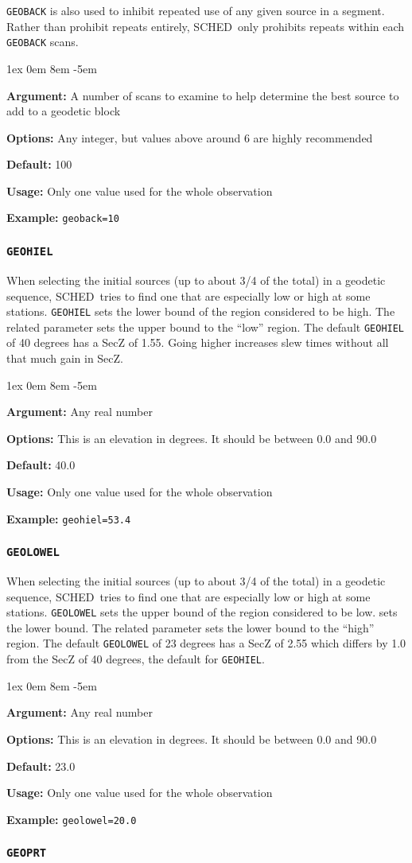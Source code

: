 \documentclass{report}
\newcommand{\schedb}{{\sc SCHED~}}
\newcommand{\rcwbox}[5]{
  \begin{list}{}{\parsep 1ex  \itemsep 0em
                 \leftmargin 8em  \itemindent -5em }
    \item {\bf Argument:} #1
    \item {\bf Options:}  #2
    \item {\bf Default:}  #3
    \item {\bf Usage:}    #4
    \item {\bf Example:}  #5
  \end{list}
}
\begin{document}
{\tt GEOBACK} is also used to inhibit repeated use of any given source
in a segment.  Rather than prohibit repeats entirely, \schedb only
prohibits repeats within each {\tt GEOBACK} scans.

\rcwbox
{A number of scans to examine to help determine the best source to add
to a geodetic block}
{Any integer, but values above around 6 are highly recommended}
{100}
{Only one value used for the whole observation}
{{\tt geoback=10}}

\subsubsection{\label{MP:GEOHIEL}{\tt GEOHIEL}}

When selecting the initial sources (up to about 3/4 of the total)
in a geodetic sequence, \schedb tries to find one that are especially
low or high at some stations.  {\tt GEOHIEL} sets the lower bound
of the region considered to be high.  The related parameter
 sets the upper bound to the
``low'' region.  The default {\tt GEOHIEL} of 40 degrees has a
SecZ of 1.55.  Going higher increases slew times without all that
much gain in SecZ.

\rcwbox
{Any real number}
{This is an elevation in degrees.  It should be between 0.0 and 90.0}
{40.0}
{Only one value used for the whole observation}
{{\tt geohiel=53.4}}

\subsubsection{\label{MP:GEOLOWEL}{\tt GEOLOWEL}}

When selecting the initial sources (up to about 3/4 of the total)
in a geodetic sequence, \schedb tries to find one that are especially
low or high at some stations.  {\tt GEOLOWEL} sets the upper bound
of the region considered to be low.  
sets the lower bound.  The related parameter
 sets the lower bound to the
``high'' region.  The default {\tt GEOLOWEL} of 23 degrees has a
SecZ of 2.55 which differs by 1.0 from the SecZ of 40 degrees, the
default for {\tt GEOHIEL}.

\rcwbox
{Any real number}
{This is an elevation in degrees.  It should be between 0.0 and 90.0}
{23.0}
{Only one value used for the whole observation}
{{\tt geolowel=20.0}}

\subsubsection{\label{MP:GEOPRT}{\tt GEOPRT}}
\end{document}
